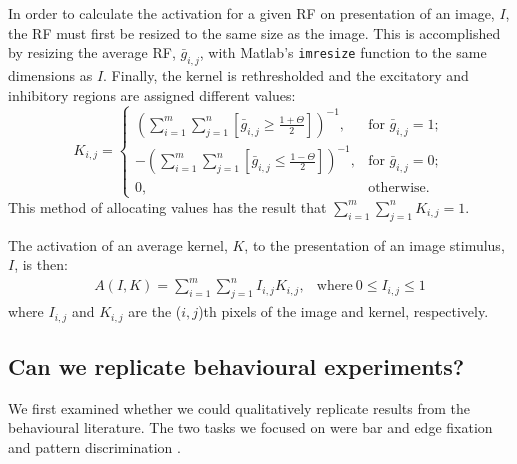 In order to calculate the activation for a given \ac{RF} on presentation of an image, $I$, the \ac{RF} must first be resized to the same size as the image.
This is accomplished by resizing the average \ac{RF}, $\bar{g}_{i,j}$, with Matlab's \texttt{imresize} function to the same dimensions as $I$.
Finally, the kernel is rethresholded and the excitatory and inhibitory regions are assigned different values:
$$
K_{i,j} = \left\{
\begin{array}{rl}
\left( \sum\limits^m_{i=1}\sum\limits^n_{j=1}[\bar{g}_{i,j} \ge \frac{1+\Theta}{2}] \right)^{-1}, & \mbox{for } \bar{g}_{i,j} = 1; \\
-\left( \sum\limits^m_{i=1}\sum\limits^n_{j=1}[\bar{g}_{i,j} \le \frac{1-\Theta}{2}] \right)^{-1}, & \mbox{for } \bar{g}_{i,j} = 0; \\
0, & \mbox{otherwise.}
\end{array}
\right.
$$
This method of allocating values has the result that $\sum\limits_{i=1}^m \sum\limits_{j=1}^n K_{i,j}=1$.

\begin{comment}
The total numbers of excitatory, $N_{\mathrm{exc}}$, and inhibitory values, $N_{\mathrm{inh}}$, for the average kernel are then calculated:
\begin{align*}
N_{\mathrm{exc}} &= \sum\limits_{i=1}^m \sum\limits_{j=1}^n [K_{i,j} = 1] \\
N_{\mathrm{inh}} &= \sum\limits_{i=1}^m \sum\limits_{j=1}^n [K_{i,j} = -1]
\end{align*}
\end{comment}

The activation of an average kernel, $K$, to the presentation of an image stimulus, $I$, is then:
$$
\begin{array}{rl}
A(I,K) = {\sum\limits^m_{i=1} \sum\limits^n_{j=1} I_{i,j}K_{i,j}}, &\mathrm{where\ } 0 \le I_{i,j} \le 1
\end{array}
$$
where $I_{i,j}$ and $K_{i,j}$ are the ($i,j$)th pixels of the image and kernel, respectively. %

\subsection{Can we replicate behavioural experiments?}
We first examined whether we could qualitatively replicate results from the behavioural literature.
The two tasks we focused on were bar and edge fixation \cite{Neuser2008,Osorio1990} and pattern discrimination \cite{Liu2006,Ernst1999}.

